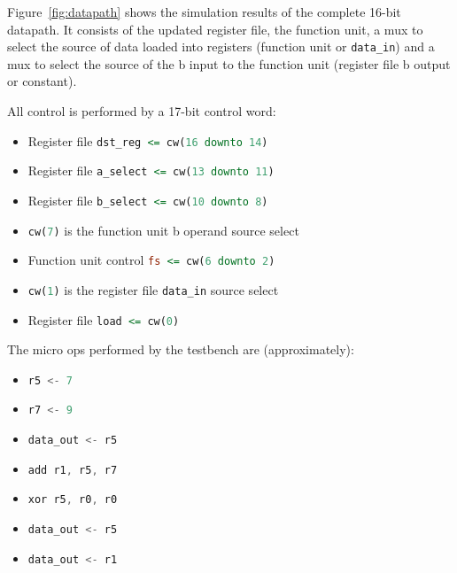 \documentclass[a4paper]{article}
\numberwithin{figure}{section}
\numberwithin{table}{section}
\newcommand{\mi}{\mintinline}
\begin{document}
Figure~\ref{fig:datapath} shows the simulation results of the complete 16-bit datapath.
It consists of the updated register file, the function unit, a mux to select the source of 
data loaded into registers (function unit or \mi{c}{data_in}) and a mux to select the source 
of the b input to the function unit (register file b output or constant).

All control is performed by a 17-bit control word:
\begin{itemize}
	\item Register file \mi{vhdl}{dst_reg <= cw(16 downto 14)}
	\item Register file \mi{vhdl}{a_select <= cw(13 downto 11)}
	\item Register file \mi{vhdl}{b_select <= cw(10 downto 8)}
	\item \mi{vhdl}{cw(7)} is the function unit b operand source select
	\item Function unit control \mi{vhdl}{fs <= cw(6 downto 2)}
	\item \mi{vhdl}{cw(1)} is the register file \mi{c}{data_in} source select
	\item Register file \mi{vhdl}{load <= cw(0)}
\end{itemize}

The micro ops performed by the testbench are (approximately):
\begin{itemize}
	\item \mi{c}{r5 <- 7}
	\item \mi{c}{r7 <- 9}
	\item \mi{c}{data_out <- r5}
	\item \mi{c}{add r1, r5, r7}
	\item \mi{c}{xor r5, r0, r0}
	\item \mi{c}{data_out <- r5}
	\item \mi{c}{data_out <- r1}
\end{itemize}
\end{document}
